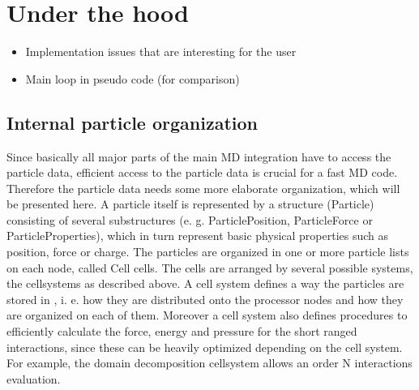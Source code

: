 %  
%   
%  
%  
%
\chapter{Under the hood}
\label{chap:underhood}

\begin{itemize}
\item Implementation issues that are interesting for the user
\item Main loop in pseudo code (for comparison)
\end{itemize}

\section{Internal particle organization}
\label{sec:internal-particle-organization}

Since basically all major parts of the main MD integration have to
access the particle data, efficient access to the particle data is
crucial for a fast MD code. Therefore the particle data needs some
more elaborate organization, which will be presented here. A particle
itself is represented by a structure (Particle) consisting of several
substructures (e. g. ParticlePosition, ParticleForce or
ParticleProperties), which in turn represent basic physical properties
such as position, force or charge. The particles are organized in one
or more particle lists on each node, called Cell cells. The cells are
arranged by several possible systems, the cellsystems as described
above. A cell system defines a way the particles are stored in \es{},
i. e. how they are distributed onto the processor nodes and how they
are organized on each of them. Moreover a cell system also defines
procedures to efficiently calculate the force, energy and pressure for
the short ranged interactions, since these can be heavily optimized
depending on the cell system. For example, the domain decomposition
cellsystem allows an order N interactions evaluation.

